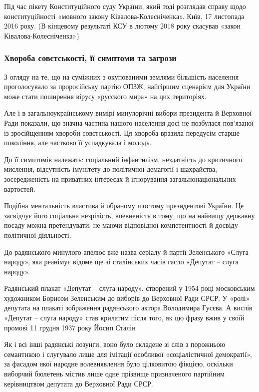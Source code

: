 Під час пікету Конституційного суду України, який тоді розглядав справу щодо
конституційності «мовного закону Ківалова-Колесніченка». Київ, 17 листопада
2016 року. (В кінцевому результаті КСУ в лютому 2018 року скасував «закон
Ківалова-Колесніченка»)

\subsubsection{Хвороба совєтськості, її симптоми та загрози}

З огляду на те, що на суміжних з окупованими землями більшість населення
проголосувало за проросійську партію ОПЗЖ, найгіршим сценарієм для України може
стати поширення вірусу «русского мира» на цих територіях.

Але і в загальноукраїнському вимірі минулорічні вибори президента й Верховної
Ради показали, що значна частина нашого населення досі не позбулася пов’язаної
із зросійщенням хвороби совєтськості. Ця хвороба вразила передусім старше
покоління, але частково її успадкувала і молодь.

До її симптомів належать: соціальний інфантилізм, нездатність до критичного
мислення, відсутність імунітету до політичної демагогії і шахрайства,
зосередженість на приватних інтересах й ігнорування загальнонаціональних
вартостей.

Подібна ментальність властива й обраному шостому президентові України. Це
засвідчує його соціальна незрілість, впевненість в тому, що на найвищу державну
посаду можна претендувати, не маючи відповідної компетентності й досвіду
політичної діяльності.

До радянського минулого апелює вже назва серіалу й партії Зеленського «Слуга
народу», яка реанімує відоме ще зі сталінських часів гасло «Депутат – слуга
народу».


Радянський плакат «Депутат – слуга народу», створений у 1954 році московським
художником Борисом Зеленським до виборів до Верховної Ради СРСР. У «ролі»
депутата на плакаті зображення радянського актора Володимира Гусєва. А вислів
«Депутат – слуга народу» став крилатим після того, як цю фразу вжив у своїй
промові 11 грудня 1937 року Йосип Сталін

Як і всі інші радянські лозунги, воно було складене зі слів з порожньою
семантикою і слугувало лише для імітації особливої «соціалістичної демократії»,
за фасадом якої народне волевиявлення було цілковитою фікцією, оскільки
виборчий бюлетень містив лише одне прізвище призначеного партійним керівництвом
депутата до Верховної Ради СРСР.

